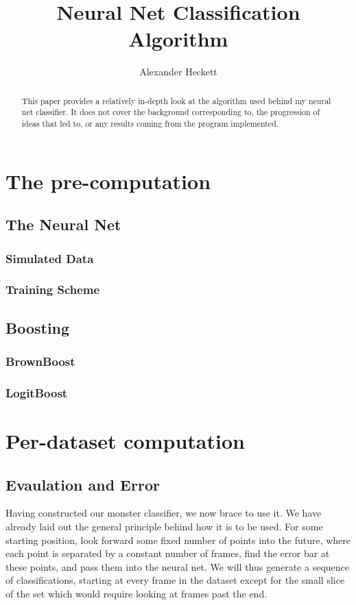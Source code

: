 \documentclass{article}
\begin{document}
\title{Neural Net Classification Algorithm}
\author{Alexander Heckett}
\maketitle
\begin{abstract}
This paper provides a relatively in-depth look at the algorithm used behind my neural net classifier. It does not cover the background corresponding to, the progression of ideas that led to, or any results coming from the program implemented. 
\end{abstract}
\tableofcontents
\section{The pre-computation}
\subsection{The Neural Net}
\subsubsection{Simulated Data}
\subsubsection{Training Scheme}
\subsection{Boosting}
\subsubsection{BrownBoost}
\subsubsection{LogitBoost}
\section{Per-dataset computation}
\subsection{Evaulation and Error}
\indent \indent Having constructed our monster classifier, we now brace to use it. We have already laid out the general principle behind how it is to be used. For some starting position, look forward some fixed number of points into the future, where each point is separated by a constant number of frames, find the error bar at these points, and pass them into the neural net. We will thus generate a sequence of classifications, starting at every frame in the dataset except for the small slice of the set which would require looking at frames past the end.
\newline
\indent 
\end{document}
